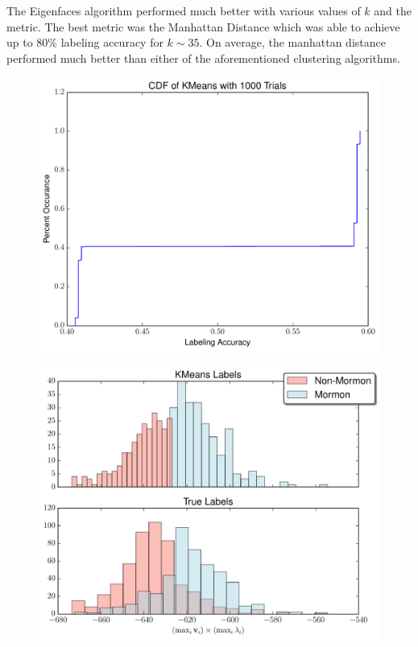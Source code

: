 \documentclass{article}
\begin{document}
The Eigenfaces algorithm performed much better with various values of $k$ and the metric. The best metric was the Manhattan Distance which was able to achieve up to 80\% labeling accuracy for $k \sim 35$. On average, the manhattan distance performed much better than either of the aforementioned clustering algorithms. 

\begin{figure}
\centering
\begin{minipage}{.5\textwidth}
  \centering
  \includegraphics[width=.75\linewidth]{data/kmeans_cdf}
  \label{fig:kmeans_cdf}
\end{minipage}%
\begin{minipage}{.5\textwidth}
  \centering
  \includegraphics[width=.75\linewidth]{data/eigennorm.pdf}
  \label{fig:kmeans_label}
\end{minipage}
\end{figure}
\end{document}
